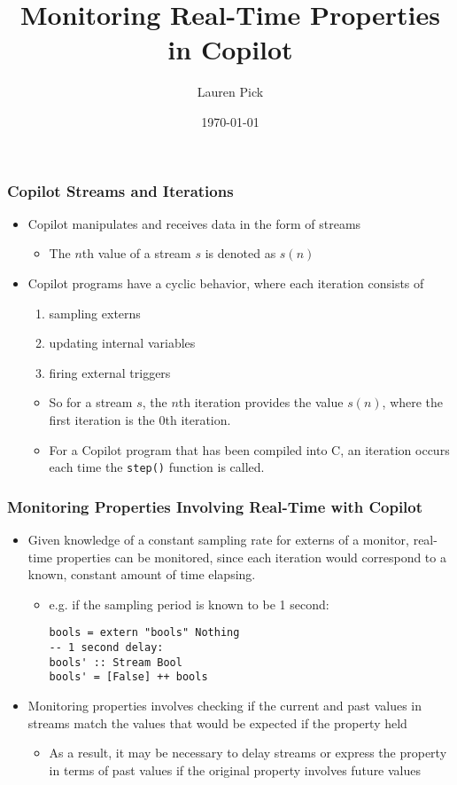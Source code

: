 \documentclass{beamer}
\title{Monitoring Real-Time Properties in Copilot}
\author{Lauren Pick}
\date{\today}
\begin{document}
\maketitle

\begin{frame}[fragile]
\frametitle{Copilot Streams and Iterations}
\begin{itemize}
\item Copilot manipulates and receives data in the form of streams
  \begin{itemize}
  \item The $n$th value of a stream $s$ is denoted as $s(n)$
  \end{itemize}
\item Copilot programs have a cyclic behavior, where each iteration consists of
  \begin{enumerate}
  \item sampling externs
  \item updating internal variables
  \item firing external triggers
  \end{enumerate}
  \begin{itemize}
  \item So for a stream $s$, the $n$th iteration provides the value
        $s(n)$, where the first iteration is the 0th iteration.
  \item For a Copilot program that has been compiled into C, an iteration
        occurs each time the \verb,step(), function is called.
  \end{itemize}
\end{itemize}
\end{frame}

\begin{frame}[fragile]
\frametitle{Monitoring Properties Involving Real-Time with Copilot}
\begin{itemize}
\item Given knowledge of a constant sampling rate for externs of a monitor,
real-time properties can be monitored, since each iteration would
correspond to a known, constant amount of time elapsing.
  \begin{itemize}
  \item e.g. if the sampling period is known to be 1 second:
\begin{lstlisting}
bools = extern "bools" Nothing
-- 1 second delay:
bools' :: Stream Bool
bools' = [False] ++ bools
\end{lstlisting}
  \end{itemize}
\item Monitoring properties involves checking if the current and past values
in streams match the values that would be expected if the property held
  \begin{itemize}
  \item As a result, it may be necessary to delay streams or express
  the property in terms of past values if the original property involves future
  values
  \end{itemize}
\end{itemize}
\end{frame}
\end{document}
